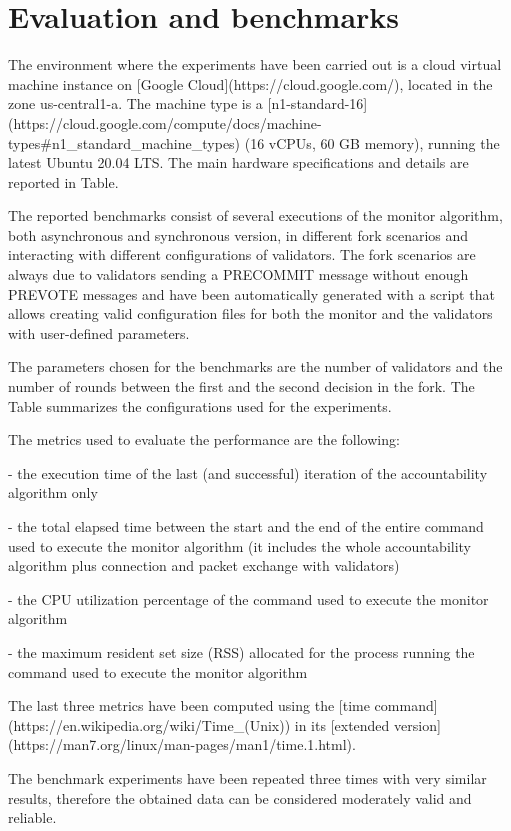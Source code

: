 \documentclass[a4paper,11pt,oneside]{report}
\begin{document}
\chapter{Evaluation and benchmarks}

\begin{markdown}

The environment where the experiments have been carried out is a cloud virtual machine instance on [Google Cloud](https://cloud.google.com/), located in the zone us-central1-a. 
The machine type is a [n1-standard-16](https://cloud.google.com/compute/docs/machine-types#n1_standard_machine_types) (16 vCPUs, 60 GB memory), running the latest Ubuntu 20.04 LTS. The main hardware specifications and details are reported in Table.

The reported benchmarks consist of several executions of the monitor algorithm, both asynchronous and synchronous version, in different fork scenarios and interacting with different configurations of validators.
The fork scenarios are always due to validators sending a PRECOMMIT message without enough PREVOTE messages and have been automatically generated with a script that allows creating valid configuration files for both the monitor and the validators with user-defined parameters.

The parameters chosen for the benchmarks are the number of validators and the number of rounds between the first and the second decision in the fork. 
The Table summarizes the configurations used for the experiments.

The metrics used to evaluate the performance are the following:

- the execution time of the last (and successful) iteration of the accountability algorithm only

- the total elapsed time between the start and the end of the entire command used to execute the monitor algorithm (it includes the whole accountability algorithm plus connection and packet exchange with validators)

- the CPU utilization percentage of the command used to execute the monitor algorithm

- the maximum resident set size (RSS) allocated for the process running the command used to execute the monitor algorithm~\cite{wiki:rss}

The last three metrics have been computed using the [time command](https://en.wikipedia.org/wiki/Time_(Unix)) in its [extended version](https://man7.org/linux/man-pages/man1/time.1.html).

The benchmark experiments have been repeated three times with very similar results, therefore the obtained data can be considered moderately valid and reliable.

\end{markdown}
\end{document}
